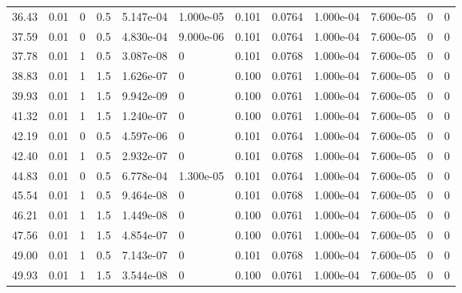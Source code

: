 \documentclass[preview]{standalone}
\begin{document}
{{\begin{tabular}{L{1.2cm}C{1.2cm} C{0.3cm}C{0.5cm} C{1.4cm}C{1.4cm} C{1.4cm}C{1.4cm} C{1.6cm}C{1.6cm} C{1.6cm}C{1.6cm}}
  36.43  &  0.01  & 0     & 0.5 &  5.147e-04  & 1.000e-05  &  0.101&   0.0764& 1.000e-04 & 7.600e-05   &  0 & 0  \\ 
  37.59  &  0.01  & 0     & 0.5 &  4.830e-04  & 9.000e-06  &  0.101&   0.0764& 1.000e-04 & 7.600e-05   &  0 & 0  \\ 
  37.78  &  0.01  & 1     & 0.5 &  3.087e-08  & 0  &  0.101&   0.0768& 1.000e-04 & 7.600e-05   &  0 & 0  \\ 
  38.83  &  0.01  & 1     & 1.5 &  1.626e-07  & 0  &  0.100&   0.0761& 1.000e-04 & 7.600e-05   &  0 & 0  \\ 
  39.93  &  0.01  & 1     & 1.5 &  9.942e-09  & 0  &  0.100&   0.0761& 1.000e-04 & 7.600e-05   &  0 & 0  \\ 
  41.32  &  0.01  & 1     & 1.5 &  1.240e-07  & 0  &  0.100&   0.0761& 1.000e-04 & 7.600e-05   &  0 & 0  \\ 
  42.19  &  0.01  & 0     & 0.5 &  4.597e-06  & 0  &  0.101&   0.0764& 1.000e-04 & 7.600e-05   &  0 & 0  \\ 
  42.40  &  0.01  & 1     & 0.5 &  2.932e-07  & 0  &  0.101&   0.0768& 1.000e-04 & 7.600e-05   &  0 & 0  \\ 
  44.83  &  0.01  & 0     & 0.5 &  6.778e-04  & 1.300e-05  &  0.101&   0.0764& 1.000e-04 & 7.600e-05   &  0 & 0  \\ 
  45.54  &  0.01  & 1     & 0.5 &  9.464e-08  & 0  &  0.101&   0.0768& 1.000e-04 & 7.600e-05   &  0 & 0  \\ 
  46.21  &  0.01  & 1     & 1.5 &  1.449e-08  & 0  &  0.100&   0.0761& 1.000e-04 & 7.600e-05   &  0 & 0  \\ 
  47.56  &  0.01  & 1     & 1.5 &  4.854e-07  & 0  &  0.100&   0.0761& 1.000e-04 & 7.600e-05   &  0 & 0  \\ 
  49.00  &  0.01  & 1     & 0.5 &  7.143e-07  & 0  &  0.101&   0.0768& 1.000e-04 & 7.600e-05   &  0 & 0  \\ 
  49.93  &  0.01  & 1     & 1.5 &  3.544e-08  & 0  &  0.100&   0.0761& 1.000e-04 & 7.600e-05   &  0 & 0  \\ 
\hline 
\end{tabular} 

}}
\end{document}

